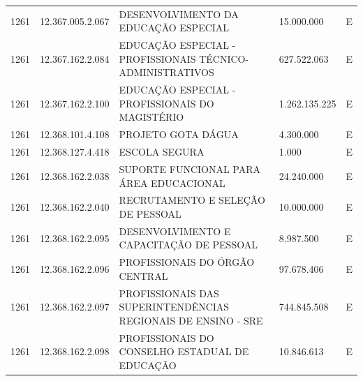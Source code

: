 \documentclass{article}
\begin{document}
\begin{longtable}[c]{m{1cm}|m{2cm}|m{10cm}|m{2cm}|m{1cm}}
\multicolumn{1}{C{1cm}|}{1261} & \multicolumn{1}{C{2cm}|}{12.367.005.2.067} & \multicolumn{1}{L{10cm}|}{DESENVOLVIMENTO DA EDUCAÇÃO ESPECIAL} & \multicolumn{1}{R{2cm}|}{15.000.000} & \multicolumn{1}{C{1cm}}{E} \\
\multicolumn{1}{C{1cm}|}{1261} & \multicolumn{1}{C{2cm}|}{12.367.162.2.084} & \multicolumn{1}{L{10cm}|}{EDUCAÇÃO ESPECIAL - PROFISSIONAIS TÉCNICO-ADMINISTRATIVOS} & \multicolumn{1}{R{2cm}|}{627.522.063} & \multicolumn{1}{C{1cm}}{E} \\
\multicolumn{1}{C{1cm}|}{1261} & \multicolumn{1}{C{2cm}|}{12.367.162.2.100} & \multicolumn{1}{L{10cm}|}{EDUCAÇÃO ESPECIAL - PROFISSIONAIS DO MAGISTÉRIO} & \multicolumn{1}{R{2cm}|}{1.262.135.225} & \multicolumn{1}{C{1cm}}{E} \\
\multicolumn{1}{C{1cm}|}{1261} & \multicolumn{1}{C{2cm}|}{12.368.101.4.108} & \multicolumn{1}{L{10cm}|}{PROJETO GOTA DÁGUA} & \multicolumn{1}{R{2cm}|}{4.300.000} & \multicolumn{1}{C{1cm}}{E} \\
\multicolumn{1}{C{1cm}|}{1261} & \multicolumn{1}{C{2cm}|}{12.368.127.4.418} & \multicolumn{1}{L{10cm}|}{ESCOLA SEGURA} & \multicolumn{1}{R{2cm}|}{1.000} & \multicolumn{1}{C{1cm}}{E} \\
\multicolumn{1}{C{1cm}|}{1261} & \multicolumn{1}{C{2cm}|}{12.368.162.2.038} & \multicolumn{1}{L{10cm}|}{SUPORTE FUNCIONAL PARA ÁREA EDUCACIONAL} & \multicolumn{1}{R{2cm}|}{24.240.000} & \multicolumn{1}{C{1cm}}{E} \\
\multicolumn{1}{C{1cm}|}{1261} & \multicolumn{1}{C{2cm}|}{12.368.162.2.040} & \multicolumn{1}{L{10cm}|}{RECRUTAMENTO E SELEÇÃO DE PESSOAL} & \multicolumn{1}{R{2cm}|}{10.000.000} & \multicolumn{1}{C{1cm}}{E} \\
\multicolumn{1}{C{1cm}|}{1261} & \multicolumn{1}{C{2cm}|}{12.368.162.2.095} & \multicolumn{1}{L{10cm}|}{DESENVOLVIMENTO E CAPACITAÇÃO DE PESSOAL} & \multicolumn{1}{R{2cm}|}{8.987.500} & \multicolumn{1}{C{1cm}}{E} \\
\multicolumn{1}{C{1cm}|}{1261} & \multicolumn{1}{C{2cm}|}{12.368.162.2.096} & \multicolumn{1}{L{10cm}|}{PROFISSIONAIS DO ÓRGÃO CENTRAL} & \multicolumn{1}{R{2cm}|}{97.678.406} & \multicolumn{1}{C{1cm}}{E} \\
\multicolumn{1}{C{1cm}|}{1261} & \multicolumn{1}{C{2cm}|}{12.368.162.2.097} & \multicolumn{1}{L{10cm}|}{PROFISSIONAIS DAS SUPERINTENDÊNCIAS REGIONAIS DE ENSINO - SRE} & \multicolumn{1}{R{2cm}|}{744.845.508} & \multicolumn{1}{C{1cm}}{E} \\
\multicolumn{1}{C{1cm}|}{1261} & \multicolumn{1}{C{2cm}|}{12.368.162.2.098} & \multicolumn{1}{L{10cm}|}{PROFISSIONAIS DO CONSELHO ESTADUAL DE EDUCAÇÃO} & \multicolumn{1}{R{2cm}|}{10.846.613} & \multicolumn{1}{C{1cm}}{E} \\

\end{longtable}
\end{document}
